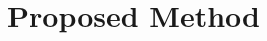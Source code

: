 \documentclass{article}
\newcommand{\h}{\mtxb{h}}
\newcommand{\R}{\mtxb{R}}
\begin{document}



\section{Proposed Method}
\label{sec:proposed_method}
\end{document}
